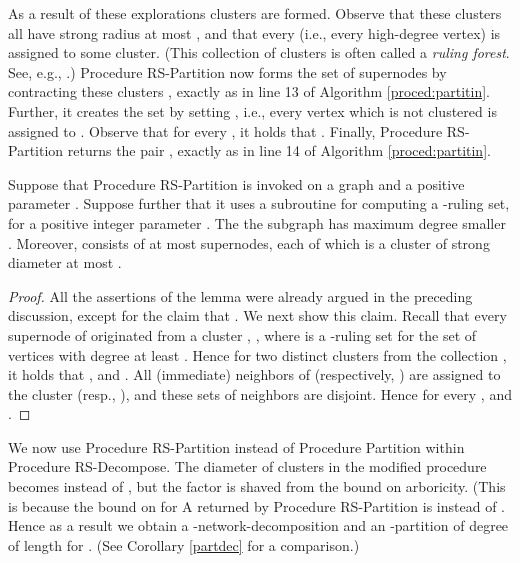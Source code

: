 \documentclass[11pt]{article}
\begin{document}
As a result of these explorations clusters  are formed. Observe that these clusters all have strong radius at most , and that every  (i.e., every high-degree vertex) is assigned to some cluster. (This collection of clusters is often called a {\em ruling forest}. See, e.g., \cite{AGLP89}.) Procedure RS-Partition now forms the set  of supernodes by contracting these clusters , exactly as in line 13 of Algorithm \ref{proced:partitin}. Further, it creates the set  by setting , i.e., every vertex  which is not clustered is assigned to . Observe that for every , it holds that . Finally, Procedure RS-Partition returns the pair , exactly as in line 14 of Algorithm \ref{proced:partitin}.
\begin{lem} \label{rprulin}
Suppose that Procedure RS-Partition is invoked on a graph  and a positive parameter . Suppose further that it uses a subroutine for computing a -ruling set, for a positive integer parameter . The the subgraph  has maximum degree smaller . Moreover,  consists of at most  supernodes, each of which is a cluster of strong diameter at most .
\end{lem}
\begin{proof}
All the assertions of the lemma were already argued in the preceding discussion, except for the claim that . We next show this claim. Recall that every supernode of  originated from a cluster , , where  is a -ruling set for the set  of vertices with degree at least . Hence for two distinct clusters  from the collection , it holds that , and . All (immediate) neighbors of  (respectively, ) are assigned to the cluster  (resp., ), and these sets of neighbors are disjoint. Hence  for every , and .
\end{proof}

We now use Procedure RS-Partition instead of Procedure Partition within Procedure RS-Decompose. The diameter of clusters in the modified procedure becomes  instead of , but the factor  is shaved from the bound on arboricity.
 (This is because the bound on  for A returned by Procedure RS-Partition is  instead of .
Hence as a result we obtain a -network-decomposition  and an -partition  of degree  of length  for . (See Corollary \ref{partdec} for a comparison.)
\end{document}

